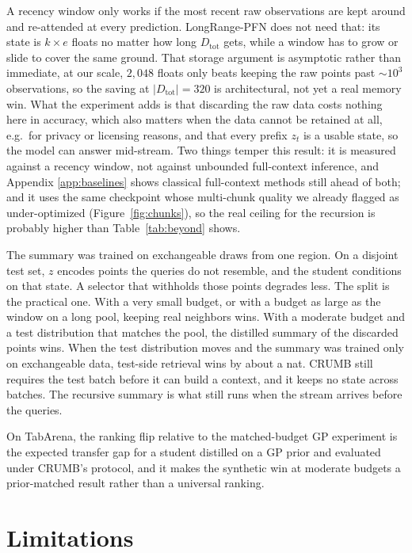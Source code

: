 \documentclass{article}
\newcommand{\Dtot}{D_{\mathrm{tot}}}
\begin{document}
A recency window only works if the most recent raw observations are
kept around and re-attended at every prediction. LongRange-PFN does not
need that: its state is $k \times e$ floats no matter how long $\Dtot$
gets, while a window has to grow or slide to cover the same ground. That
storage argument is asymptotic rather than immediate, at our scale,
$2{,}048$ floats only beats keeping the raw points past
$\sim\!10^3$ observations, so the saving at $|\Dtot|=320$ is architectural,
not yet a real memory win. What the experiment adds is that discarding the
raw data costs nothing here in accuracy, which also matters when the data
cannot be retained at all, e.g.\ for privacy or licensing reasons, and that
every prefix $z_t$ is a usable state, so the model can answer mid-stream.
Two things temper this result: it is measured against a recency window,
not against unbounded full-context inference, and Appendix
\ref{app:baselines} shows classical full-context methods still ahead of
both; and it uses the same checkpoint whose multi-chunk quality we already
flagged as under-optimized (Figure~\ref{fig:chunks}), so the real ceiling
for the recursion is probably higher than Table~\ref{tab:beyond} shows.

The summary was trained on exchangeable
draws from one region. On a disjoint test set, $z$ encodes points the
queries do not resemble, and the student conditions on that state. A
selector that withholds those points degrades less.
The split is the practical one. With a very small budget, or with a budget
as large as the window on a long pool, keeping real neighbors wins. With a
moderate budget and a test distribution that matches the pool, the
distilled summary of the discarded points wins. When the test distribution
moves and the summary was trained only on exchangeable data, test-side
retrieval wins by about a nat. CRUMB still requires the test batch before
it can build a context, and it keeps no state across batches. The recursive
summary is what still runs when the stream arrives before the queries.

On TabArena, the ranking flip relative to the matched-budget GP experiment
is the expected transfer gap for a student distilled on a GP prior
and evaluated under CRUMB's protocol, and it makes the synthetic win at
moderate budgets a prior-matched result rather than a universal ranking.

\section{Limitations}
\label{sec:limitations}
\end{document}
